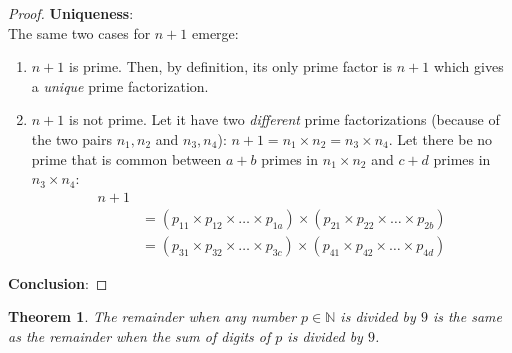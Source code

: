 \documentclass[a4paper]{article}
\newtheorem{theorem}{Theorem}
\begin{document}
\begin{proof}
 \noindent\textbf{Uniqueness}:\\
    The same two cases for $n+1$ emerge:
    \begin{enumerate}
        \item $n+1$ is prime. Then, by definition, its only prime factor is $n+1$ which gives a \emph{unique} prime factorization. 
        \item $n+1$ is not prime. Let it have two \emph{different} prime factorizations (because of the two pairs $n_1, n_2$ and $n_3, n_4$): $n+1 = n_1\times n_2 = n_3\times n_4$. 
             Let there be no prime that is common between $a+b$ primes in $n_1\times n_2$ and $c+d$ primes in $n_3\times n_4$:
             \begin{align*}
                n + 1\\
             &= (p_{11}\times p_{12}\times \dots \times p_{1a}) \times
                (p_{21}\times p_{22}\times \dots \times p_{2b})\\
             &= (p_{31}\times p_{32}\times \dots \times p_{3c}) \times
                (p_{41}\times p_{42}\times \dots \times p_{4d})
            \end{align*}
    \end{enumerate}

\noindent\textbf{Conclusion}:
\end{proof}
\begin{theorem}
    \label{theorem: div-by-9}
    The remainder when any number $p \in \mathbb{N}$ is divided by $9$ is the same as the remainder when the sum of digits of $p$ is divided by $9$.
\end{theorem}
\end{document}
